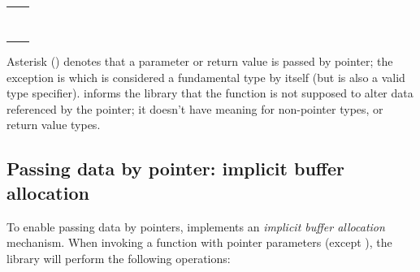 \documentclass[a4paper,12pt,twoside,extrafontsizes]{memoir}
\begin{document}
\begin{table}[htbp]
\begin{tabularx}{\textwidth}{Ll}
		 &  \\
		 &  \\
		 &  \\
		 &  \\
		 &  \\
		 &  \\
		 &  \\
		 &  \\
		\bottomrule
	\end{tabularx}
\end{table}

Asterisk (\cexpr{*}) denotes that a parameter or return value is passed by pointer; the exception is  which is considered a fundamental type by itself (but  is also a valid type specifier).  informs the library that the function is not supposed to alter data referenced by the pointer; it doesn't have meaning for non-pointer types,  or return value types.

\subsection{Passing data by pointer: implicit buffer allocation}

To enable passing data by pointers,  implements an \emph{implicit buffer allocation} mechanism. When invoking a function with pointer parameters (except ), the library will perform the following operations:
\end{document}

